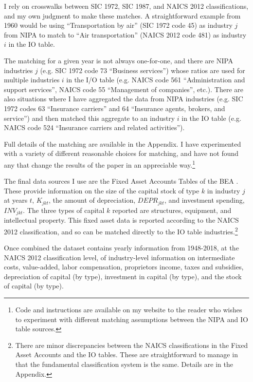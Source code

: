 \documentclass[11pt]{article}
\begin{document}
I rely on crosswalks between SIC 1972, SIC 1987, and NAICS 2012 classifications, and my own judgment to make these matches. A straightforward example from 1960 would be using ``Transportation by air'' (SIC 1972 code 45) as industry $j$ from NIPA to match to ``Air transportation'' (NAICS 2012 code 481) as industry $i$ in the IO table.

The matching for a given year is not always one-for-one, and there are NIPA industries $j$ (e.g. SIC 1972 code 73 ``Business services'') whose ratios are used for multiple industries $i$ in the I/O table (e.g. NAICS code 561 ``Administration and support services'', NAICS code 55 ``Management of companies'', etc.). There are also situations where I have aggregated the data from NIPA industries (e.g. SIC 1972 codes 63 ``Insurance carriers'' and 64 ``Insurance agents, brokers, and service'') and then matched this aggregate to an industry $i$ in the IO table (e.g. NAICS code 524 ``Insurance carriers and related activities''). 

Full details of the matching are available in the Appendix. I have experimented with a variety of different reasonable choices for matching, and have not found any that change the results of the paper in an appreciable way.\footnote{Code and instructions are available on my website to the reader who wishes to experiment with different matching assumptions between the NIPA and IO table sources.}

The final data sources I use are the Fixed Asset Accounts Tables of the BEA \citep{beacap,beagov}. These provide information on the size of the capital stock of type $k$ in industry $j$ at years $t$, $K_{jkt}$, the amount of depreciation, $DEPR_{jkt}$, and investment spending, $INV_{jkt}$. The three types of capital $k$ reported are structures, equipment, and intellectual property. This fixed asset data is reported according to the NAICS 2012 classification, and so can be matched directly to the IO table industries.\footnote{There are minor discrepancies between the NAICS classifications in the Fixed Asset Accounts and the IO tables. These are straightforward to manage in that the fundamental classification system is the same. Details are in the Appendix.} 

Once combined the dataset contains yearly information from 1948-2018, at the NAICS 2012 classification level, of industry-level information on intermediate costs, value-added, labor compensation, proprietors income, taxes and subsidies, depreciation of capital (by type), investment in capital (by type), and the stock of capital (by type).
\end{document}
